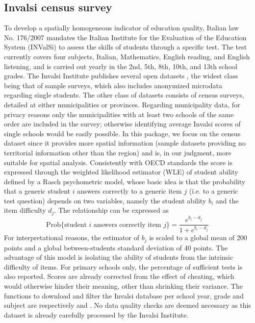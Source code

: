 \documentclass{article}%
\begin{document}
\subsection{Invalsi census survey} \label{par:Invalsi}
To develop a spatially homogeneous indicator of education quality, Italian law No. 176/2007 \citep{law} mandates the Italian Institute for the Evaluation of the Education System (INValSi) to assess the skills of students through a specific test. The test currently covers four subjects, Italian, Mathematics, English reading, and English listening, and is carried out yearly in the 2nd, 5th, 8th, 10th, and 13th school grades. 
The Invalsi Institute publishes several open datasets \citep{Invalsi_IS}, the widest class being that of sample surveys, which also includes anonymized microdata regarding single students. The other class of datasets consists of census surveys, detailed at either municipalities or provinces. Regarding municipality data, for privacy reasons only the municipalities with at least two schools of the same order are included in the survey; otherwise identifying average Invalsi scores of single schools would be easily possible. In this package, we focus on the census dataset since it provides more spatial information (sample datasets providing no territorial information other than the region) and is, in our judgment, more suitable for spatial analysis. 
Consistently with OECD standards \citep{PISA} the score is expressed through the weighted likelihood estimator (WLE) of student ability defined by a Rasch psychometric model, whose basic idea is that the probability that a generic student $i$ answers correctly to a generic item $j$ (i.e. to a generic test question) depends on two variables, namely the student ability $b_i$ and the item difficulty $d_j$. The relationship can be expressed as
$$
\mathrm{Prob} \lbrace \text{student } i \text{ answers correctly item } j \rbrace= \frac{e^{b_i - d_j}}{1 + e^{b_i - d_j}}
$$
For interpretational reasons, the estimator of $b_j$ is scaled to a global mean of 200 points and a global between-students standard deviation of 40 points. The advantage of this model is isolating the ability of students from the intrinsic difficulty of items. For primary schools only, the percentage of sufficient tests is also reported. Scores are already corrected from the effect of cheating, which would otherwise hinder their meaning, other than shrinking their variance. The functions to download and filter the Invalsi database per school year, grade and subject are respectively \texttt{} and \texttt{}. No data quality checks are deemed necessary as this dataset is already carefully processed by the Invalsi Institute.
\end{document}
